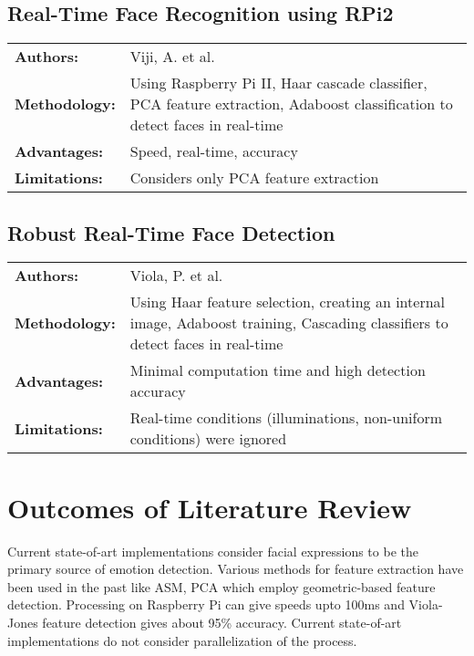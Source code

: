 \subsection{Real-Time Face Recognition using RPi2}
\begin{table}[h]
\centering
\bgroup
\def\arraystretch{1.5}
\begin{tabularx}{\linewidth}{l X}
\textbf{Authors:} & Viji, A. et al. \cite{viji2017} \\
\textbf{Methodology:} & Using Raspberry Pi II, Haar cascade classifier, PCA feature extraction, Adaboost classification to detect faces in real-time \\ 
\textbf{Advantages:} & Speed, real-time, accuracy \\
\textbf{Limitations:} & Considers only PCA feature extraction
\end{tabularx}
\egroup
\end{table}


\subsection{Robust Real-Time Face Detection}
\begin{table}[h]
\centering
\bgroup
\def\arraystretch{1.5}
\begin{tabularx}{\linewidth}{l X}
\textbf{Authors:} & Viola, P. et al. \cite{viola2004} \\
\textbf{Methodology:} & Using Haar feature selection, creating an internal image, Adaboost training, Cascading classifiers to detect faces in real-time \\ 
\textbf{Advantages:} & Minimal computation time and high detection accuracy \\
\textbf{Limitations:} & Real-time conditions (illuminations, non-uniform conditions) were ignored
\end{tabularx}
\egroup
\end{table}

\section{Outcomes of Literature Review}
Current state-of-art implementations consider facial expressions to be the primary source of emotion detection. Various methods for feature extraction have been used in the past like ASM, PCA which employ geometric-based feature detection. Processing on Raspberry Pi can give speeds upto 100ms and Viola-Jones feature detection gives about 95\% accuracy. Current state-of-art implementations do not consider parallelization of the process. 

